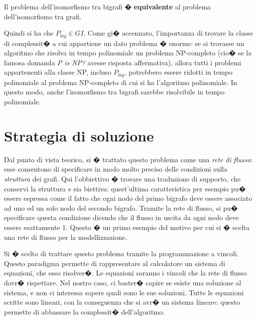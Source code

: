 \begin{corol}
Il problema dell'isomorfismo tra bigrafi � \textbf{equivalente} al problema dell'isomorfismo tra grafi.
\end{corol}


Quindi si ha che $P_{big} \in GI$. Come gi� accennato, l'importanza di trovare la classe di complessit� a cui appartiene un dato problema � enorme: se si trovasse un algoritmo che risolva in tempo polinomiale un problema NP-completo (cio� se la famosa domanda \emph{P is NP?} avesse risposta affermativa), allora tutti i problemi appartenenti alla classe NP, incluso $P_{big}$, potrebbero essere ridotti in tempo polinomiale al problema NP-completo di cui si ha l'algoritmo polinomiale. In questo modo, anche l'isomorfismo tra bigrafi sarebbe risolvibile in tempo polinomiale.


\section{Strategia di soluzione}
Dal punto di vista teorico, si � trattato questo problema come una \emph{rete di flusso}: esse consentono di specificare in modo molto preciso delle condizioni sulla \emph{struttura} dei grafi. Qui l'obbiettivo � trovare una traduzione di supporto, che conservi la struttura e sia biettiva: quest'ultima caratteristica per esempio pu� essere espressa come il fatto che ogni nodo del primo bigrafo deve essere associato ad uno ed un solo nodo del secondo bigrafo. Tramite la rete di flusso, si pu� specificare questa condizione dicendo che il flusso in uscita da ogni nodo deve essere esattamente 1. Questo � un primo esempio del motivo per cui si � scelta una rete di flusso per la modellizzazione.

Si � scelto di trattare questo problema tramite la programmazione a vincoli. Questo paradigma permette di rappresentare al calcolatore un sistema di equazioni, che esso
risolver�. Le equazioni saranno i vincoli che la rete di flusso dovr� rispettare. Nel nostro caso, ci baster� capire se esiste una soluzione al sistema, e non ci interessa sapere quali sono le sue soluzioni. Tutte le equazioni scritte sono lineari, con la conseguenza che si avr� un sistema lineare: questo permette di abbassare la complessit� dell'algoritmo.

